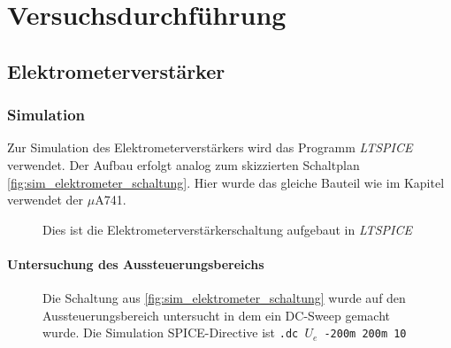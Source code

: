 \documentclass[12pt,english,ngerman]{scrartcl}
\begin{document}
\section{Versuchsdurchführung}\label{sec:Versuchsdurchf}

\subsection{Elektrometerverstärker}

\subsubsection{Simulation} \label{sec:Versuchsim}

Zur Simulation des Elektrometerverstärkers wird das Programm
\textit{LTSPICE} verwendet. Der Aufbau erfolgt analog zum skizzierten
Schaltplan \autoref{fig:sim_elektrometer_schaltung}. Hier wurde das gleiche
Bauteil wie im Kapitel  verwendet der $\mu$A741.

\begin{figure}[H]
  \centering
  \caption{Dies ist die Elektrometerverstärkerschaltung aufgebaut in \textit{LTSPICE}}
  \label{fig:sim_elektrometer_schaltung}
\end{figure}


\paragraph{Untersuchung des Aussteuerungsbereichs} \label{sec:mess_aussteuerungsbereich}


\begin{figure}[H]
  \centering
  \caption{Die Schaltung aus \autoref{fig:sim_elektrometer_schaltung} wurde auf
  den Aussteuerungsbereich untersucht in dem ein DC-Sweep gemacht wurde. Die
  Simulation SPICE-Directive ist \texttt{.dc $U_e$ -200m 200m 10}}
  \label{fig:sim_elektrometer_dcsweep}
\end{figure}
\end{document}
